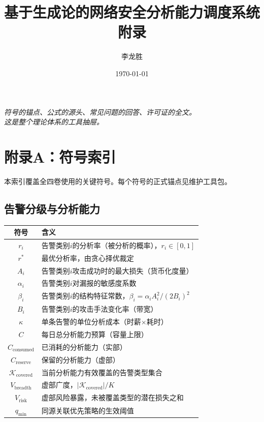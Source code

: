 \documentclass[11pt,a4paper]{article}
\title{基于生成论的网络安全分析能力调度系统\\
附录}
\author{李龙胜}
\date{\today}
\begin{document}
\maketitle

\begin{center}
\textit{
符号的锚点、公式的源头、常见问题的回答、许可证的全文。\\
这是整个理论体系的工具抽屉。
}
\end{center}

\vspace{5mm}

\tableofcontents

\section{附录A：符号索引}

本索引覆盖全四卷使用的关键符号。每个符号的正式锚点见维护工具包。

\subsection{告警分级与分析能力}

\begin{center}
\begin{xltabular}{\textwidth}{c|X}
\toprule
\textbf{符号} & \textbf{含义} \\
\midrule
$r_i$ & 告警类别$i$的分析率（被分析的概率），$r_i \in [0,1]$ \\
$r^*$ & 最优分析率，由贪心择优裁定 \\
$A_i$ & 告警类别$i$攻击成功时的最大损失（货币化度量） \\
$\alpha_i$ & 告警类别$i$对漏报的敏感度系数 \\
$\beta_i$ & 告警类别$i$的结构特征常数，$\beta_i = \alpha_i A_i^2 / (2B_i)^2$ \\
$B_i$ & 告警类别$i$的攻击手法变化率（带宽） \\
$\kappa$ & 单条告警的单位分析成本（时薪$\times$耗时） \\
$C$ & 每日总分析能力预算（容量上限） \\
$C_{\text{consumed}}$ & 已消耗的分析能力（实部） \\
$C_{\text{reserve}}$ & 保留的分析能力（虚部） \\
$\mathcal{K}_{\text{covered}}$ & 当前分析能力有效覆盖的告警类型集合 \\
$V_{\text{breadth}}$ & 虚部广度，$|\mathcal{K}_{\text{covered}}| / K$ \\
$V_{\text{risk}}$ & 虚部风险暴露，未被覆盖类型的潜在损失之和 \\
$q_{\min}$ & 同源关联优先策略的生效阈值 \\
\bottomrule
\end{xltabular}
\end{center}
\end{document}
